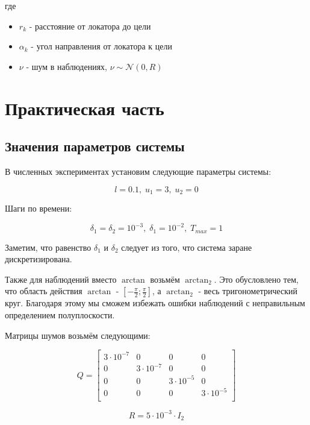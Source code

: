 \documentclass[12pt]{article}
\begin{document}
где

\begin{itemize}
	\item $r_k$ - расстояние от локатора до цели
	\item $\alpha_k$ - угол направления от локатора к цели
	\item $\nu$ - шум в наблюдениях, $\nu \sim \mathcal{N}(0, R)$
\end{itemize}

\newpage

\section{Практическая часть}

\subsection{Значения параметров системы}

В численных экспериментах установим следующие параметры системы:

\[
	l=0.1, \; u_1 = 3, \; u_2 = 0
\]

Шаги по времени:

\[
	\delta_1 = \delta_2 = 10^{-3}, \; \delta_1 = 10^{-2}, \; T_{max} = 1
\]

Заметим, что равенство $\delta_1$ и $\delta_2$ следует из того, что система заране дискретизирована.

Также для наблюдений вместо $\arctan$ возьмём $\arctan_2$. Это обусловлено тем, что область действия $\arctan$ - $[- \frac{\pi}{2}; \frac{\pi}{2} ]$, а $\arctan_2$ - весь тригонометрический круг. Благодаря этому мы сможем избежать ошибки наблюдений с неправильным определением полуплоскости.

Матрицы шумов возьмём следующими:

\[
	Q = \begin{bmatrix}
		3 \cdot 10^{-7} & 0                & 0                & 0                \\
		0               & 3 \cdot 10 ^{-7} & 0                & 0                \\
		0               & 0                & 3 \cdot 10 ^{-5} & 0                \\
		0               & 0                & 0                & 3 \cdot 10 ^{-5} \\
	\end{bmatrix}
\]

\[
	R = 5 \cdot 10^{-3} \cdot I_2
\]
\end{document}
